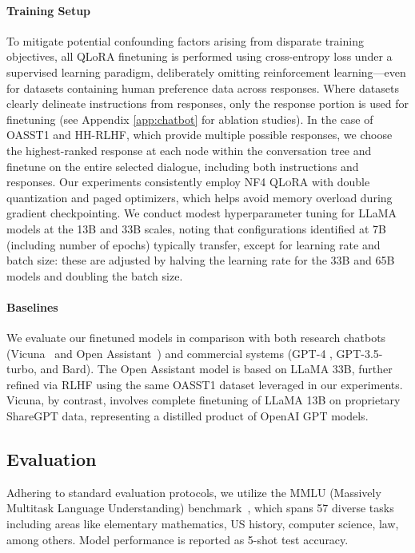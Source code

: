 \paragraph{Training Setup} To mitigate potential confounding factors arising from disparate training objectives, all QLoRA finetuning is performed using cross-entropy loss under a supervised learning paradigm, deliberately omitting reinforcement learning—even for datasets containing human preference data across responses. Where datasets clearly delineate instructions from responses, only the response portion is used for finetuning (see Appendix \ref{app:chatbot} for ablation studies). In the case of OASST1 and HH-RLHF, which provide multiple possible responses, we choose the highest-ranked response at each node within the conversation tree and finetune on the entire selected dialogue, including both instructions and responses. Our experiments consistently employ NF4 \textsc{QLoRA} with double quantization and paged optimizers, which helps avoid memory overload during gradient checkpointing. We conduct modest hyperparameter tuning for LLaMA models at the 13B and 33B scales, noting that configurations identified at 7B (including number of epochs) typically transfer, except for learning rate and batch size: these are adjusted by halving the learning rate for the 33B and 65B models and doubling the batch size.

\paragraph{Baselines} We evaluate our finetuned models in comparison with both research chatbots (Vicuna~\citep{vicuna2023} and Open Assistant~\citep{kopf2023openassistant}) and commercial systems (GPT-4 \citep{openai2023gpt}, GPT-3.5-turbo, and Bard). The Open Assistant model is based on LLaMA 33B, further refined via RLHF using the same OASST1 dataset leveraged in our experiments. Vicuna, by contrast, involves complete finetuning of LLaMA 13B on proprietary ShareGPT data, representing a distilled product of OpenAI GPT models.

\subsection{Evaluation}

Adhering to standard evaluation protocols, we utilize the MMLU (Massively Multitask Language Understanding) benchmark~\citep{hendrycksmeasuring}, which spans 57 diverse tasks including areas like elementary mathematics, US history, computer science, law, among others. Model performance is reported as 5-shot test accuracy.

